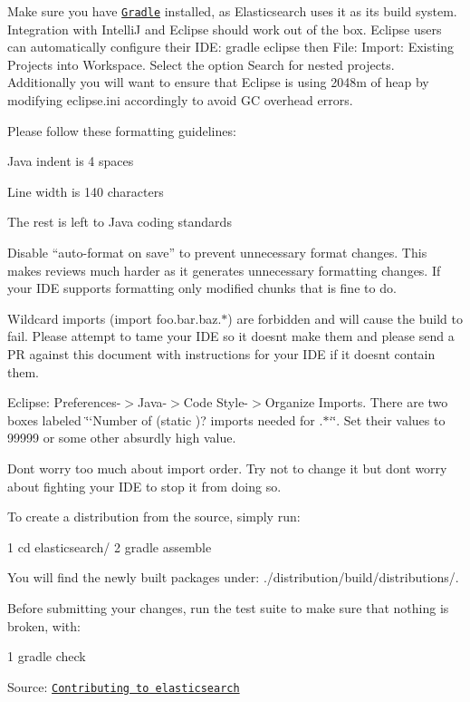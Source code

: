 Make sure you have \href{http://gradle.org}{\tt Gradle} installed, as Elasticsearch uses it as its build system. Integration with IntelliJ and Eclipse should work out of the box. Eclipse users can automatically configure their I\+DE\+: {\ttfamily gradle eclipse} then {\ttfamily File\+: Import\+: Existing Projects into Workspace}. Select the option {\ttfamily Search for nested projects}. Additionally you will want to ensure that Eclipse is using 2048m of heap by modifying {\ttfamily eclipse.\+ini} accordingly to avoid GC overhead errors.

Please follow these formatting guidelines\+:


\begin{DoxyItemize}
\item Java indent is 4 spaces
\item Line width is 140 characters
\item The rest is left to Java coding standards
\item Disable “auto-\/format on save” to prevent unnecessary format changes. This makes reviews much harder as it generates unnecessary formatting changes. If your I\+DE supports formatting only modified chunks that is fine to do.
\item Wildcard imports ({\ttfamily import foo.\+bar.\+baz.$\ast$}) are forbidden and will cause the build to fail. Please attempt to tame your I\+DE so it doesn\textquotesingle{}t make them and please send a PR against this document with instructions for your I\+DE if it doesn\textquotesingle{}t contain them.
\begin{DoxyItemize}
\item Eclipse\+: Preferences-\/$>$Java-\/$>$Code Style-\/$>$Organize Imports. There are two boxes labeled \char`\"{}`\+Number of (static )? imports needed for .$\ast$`\char`\"{}. Set their values to 99999 or some other absurdly high value.
\end{DoxyItemize}
\item Don\textquotesingle{}t worry too much about import order. Try not to change it but don\textquotesingle{}t worry about fighting your I\+DE to stop it from doing so.
\end{DoxyItemize}

To create a distribution from the source, simply run\+:


\begin{DoxyCode}
1 cd elasticsearch/
2 gradle assemble
\end{DoxyCode}


You will find the newly built packages under\+: {\ttfamily ./distribution/build/distributions/}.

Before submitting your changes, run the test suite to make sure that nothing is broken, with\+:


\begin{DoxyCode}
1 gradle check
\end{DoxyCode}


Source\+: \href{https://www.elastic.co/contributing-to-elasticsearch/}{\tt Contributing to elasticsearch} 